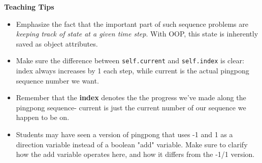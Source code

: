 \begin{blocksection}
\begin{guide}
\textbf{Teaching Tips}
  \begin{itemize}
    \item Emphasize the fact that the important part of such sequence problems are \textit{keeping track of state at a given time step}. With OOP, this state is inherently saved as object attributes. 
    \item Make sure the difference between \verb|self.current| and \verb|self.index| is clear: index always increases by 1 each step, while current is the actual pingpong sequence number we want. 
    \item Remember that the \textbf{index} denotes the the progress we've made along the pingpong sequence- current is just the current number of our sequence we happen to be on. 
    \item Students may have seen a version of pingpong that uses -1 and 1 as a direction variable instead of a boolean "add" variable. Make sure to clarify how the add variable operates here, and how it differs from the -1/1 version.
  \end{itemize}
\end{guide}
\end{blocksection}



